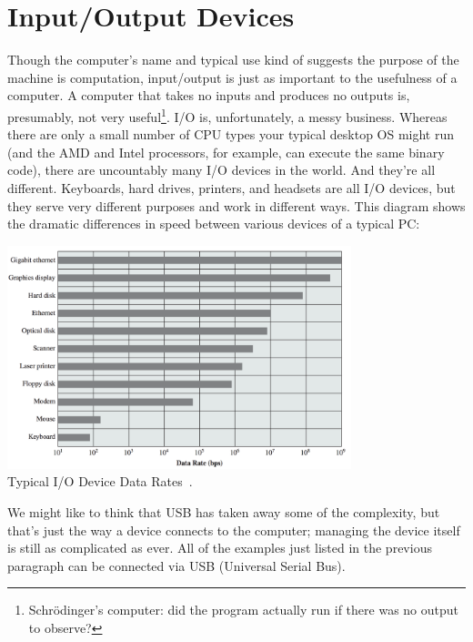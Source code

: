 




\section*{Input/Output Devices}
Though the computer's name and typical use kind of suggests the purpose of the machine is computation, input/output is just as important to the usefulness of a computer. A computer that takes no inputs and produces no outputs is, presumably, not very useful\footnote{Schr\"odinger's computer: did the program actually run if there was no output to observe?}. I/O is, unfortunately, a messy business. Whereas there are only a small number of CPU types your typical desktop OS might run (and the AMD and Intel processors, for example, can execute the same binary code), there are uncountably many I/O devices in the world. And they're all different. Keyboards, hard drives, printers, and headsets are all I/O devices, but they serve very different purposes and work in different ways. This diagram shows the dramatic differences in speed between various devices of a typical PC:

\begin{center}
	\includegraphics[width=0.75\textwidth]{images/io-device-rates.png}\\
	Typical I/O Device Data Rates~\cite{osi}.
\end{center}

We might like to think that USB has taken away some of the complexity, but that's just the way a device connects to the computer; managing the device itself is still as complicated as ever. All of the examples just listed in the previous paragraph can be connected via USB (Universal Serial Bus). 

